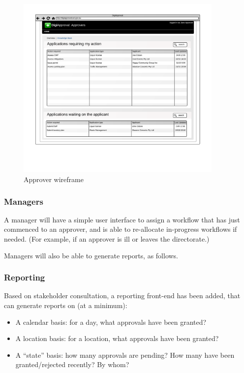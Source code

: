 \documentclass[12pt,a4paper,twosided]{article}
\begin{document}
\begin{figure}[htbp]
\centering
\includegraphics[width=0.9\textwidth]{./imgs/approver-wireframe.png}
\caption{Approver wireframe}
\end{figure}

\subsubsection{Managers}

A manager will have a simple user interface to assign a workflow that
has just commenced to an approver, and is able to re-allocate
in-progress workflows if needed. (For example, if an approver is ill or
leaves the directorate.)

Managers will also be able to generate reports, as follows.

\subsubsection{Reporting}

Based on stakeholder consultation, a reporting front-end has been added,
that can generate reports on (at a minimum):

\begin{itemize}
\itemsep1pt\parskip0pt
\item
  A calendar basis: for a day, what approvals have been granted?
\item
  A location basis: for a location, what approvals have been granted?
\item
  A ``state'' basis: how many approvals are pending? How many have been
  granted/rejected recently? By whom?
\end{itemize}
\end{document}
